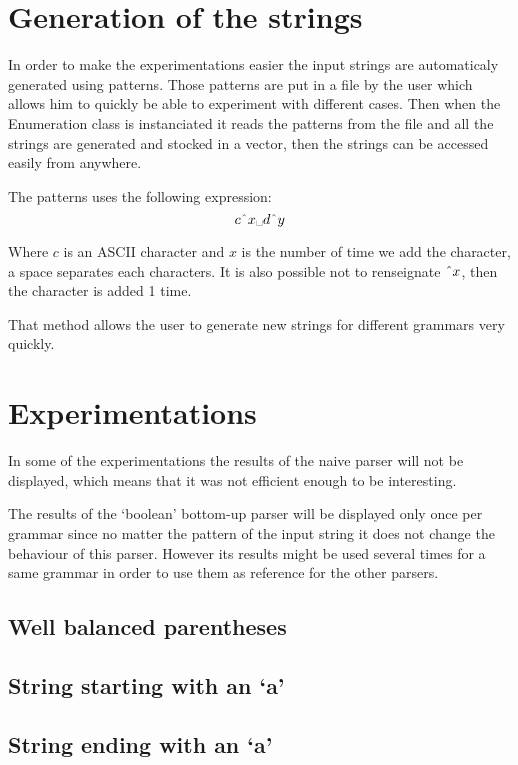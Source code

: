 
\section{Generation of the strings}

In order to make the experimentations easier the input strings are automaticaly generated using patterns.
Those patterns are put in a file by the user which allows him to quickly be able to experiment with different cases.
Then when the Enumeration class is instanciated it reads the patterns from the file and all the strings are generated and stocked in a vector, then the strings can be accessed easily from anywhere.

The patterns uses the following expression:
$$
c \string^ x \text{\textvisiblespace} d \string^ y
$$

Where $c$ is an ASCII character and $x$ is the number of time we add the character, a space separates each characters.
It is also possible not to renseignate $\string^ x$, then the character is added 1 time.

That method allows the user to generate new strings for different grammars very quickly.

\section{Experimentations}

In some of the experimentations the results of the naive parser will not be displayed, which means that it was not efficient enough to be interesting.

The results of the `boolean' bottom-up parser will be displayed only once per grammar since no matter the pattern of the input string it does not change the behaviour of this parser.
However its results might be used several times for a same grammar in order to use them as reference for the other parsers.

\subsection{Well balanced parentheses}


\subsection{String starting with an `a'}


\subsection{String ending with an `a'}

